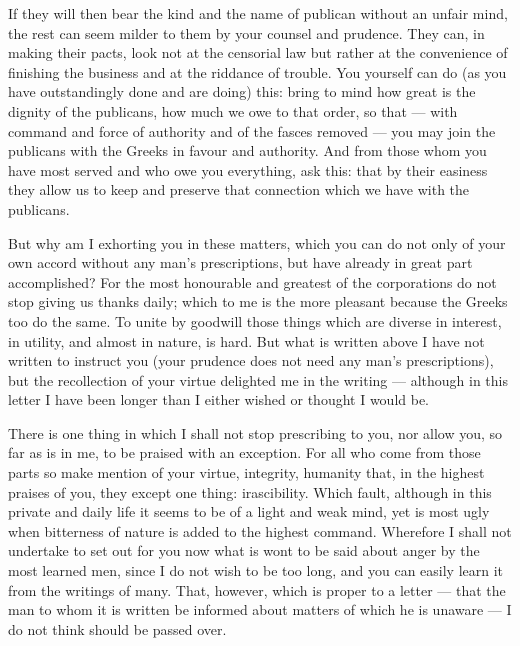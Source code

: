  If they will then bear the kind and the name of publican without an unfair mind, the rest can seem milder to them by your counsel and prudence. They can, in making their pacts, look not at the censorial law but rather at the convenience of finishing the business and at the riddance of trouble. You yourself can do (as you have outstandingly done and are doing) this: bring to mind how great is the dignity of the publicans, how much we owe to that order, so that --- with command and force of authority and of the fasces removed --- you may join the publicans with the Greeks in favour and authority. And from those whom you have most served and who owe you everything, ask this: that by their easiness they allow us to keep and preserve that connection which we have with the publicans.

 But why am I exhorting you in these matters, which you can do not only of your own accord without any man's prescriptions, but have already in great part accomplished? For the most honourable and greatest of the corporations do not stop giving us thanks daily; which to me is the more pleasant because the Greeks too do the same. To unite by goodwill those things which are diverse in interest, in utility, and almost in nature, is hard. But what is written above I have not written to instruct you (your prudence does not need any man's prescriptions), but the recollection of your virtue delighted me in the writing --- although in this letter I have been longer than I either wished or thought I would be.

 There is one thing in which I shall not stop prescribing to you, nor allow you, so far as is in me, to be praised with an exception. For all who come from those parts so make mention of your virtue, integrity, humanity that, in the highest praises of you, they except one thing: irascibility. Which fault, although in this private and daily life it seems to be of a light and weak mind, yet is most ugly when bitterness of nature is added to the highest command. Wherefore I shall not undertake to set out for you now what is wont to be said about anger by the most learned men, since I do not wish to be too long, and you can easily learn it from the writings of many. That, however, which is proper to a letter --- that the man to whom it is written be informed about matters of which he is unaware --- I do not think should be passed over.

